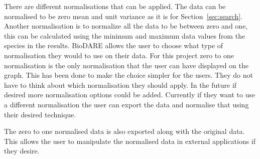 There are different normalisations that can be applied.  The data can be normalised to be zero mean and unit variance as it is for Section~\ref{sec:search}.  Another normalisation is to normalize all the data to be between zero and one, this can be calculated using the minimum and maximum data values from the species in the results.  BioDARE allows the user to choose what type of normalisation they would to use on their data.  For this project zero to one normalisation is the only normalisation that the user can have displayed on the graph.  This has been done to make the choice simpler for the users.  They do not have to think about which normalisation they should apply.  In the future if desired more normalisation options could be added.  Currently if they want to use a different normalisation the user can export the data and normalise that using their desired technique.


The zero to one normalised data is also exported along with the original data.  This allows the user to manipulate the normalised data in external applications if they desire.

